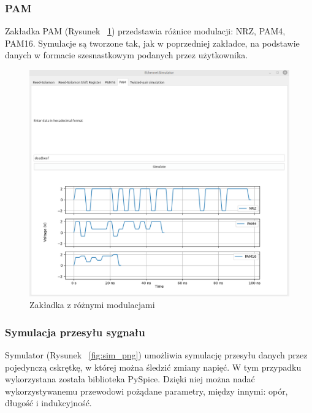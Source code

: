 \subsubsection{PAM}

Zakładka PAM (Rysunek ~\ref{fig:pam_sim_png}) przedstawia różnice modulacji: NRZ, PAM4, PAM16. Symulacje są tworzone tak, jak w poprzedniej zakładce, na podstawie danych w formacie szesnastkowym podanych przez użytkownika.

\begin{figure}[H]
    \centering
    \includegraphics[width=\textwidth]{images/pam_tab.png}
    \caption{Zakładka z różnymi modulacjami}
    \label{fig:pam_sim_png}
\end{figure}

\subsubsection{Symulacja przesyłu sygnału}
Symulator (Rysunek ~\ref{fig:sim_png}) umożliwia symulację przesyłu danych przez pojedynczą cskrętkę, w której można śledzić zmiany napięć. W tym przypadku wykorzystana została biblioteka PySpice. Dzięki niej można nadać wykorzystywanemu przewodowi pożądane parametry, między innymi: opór, długość i indukcyjność.

